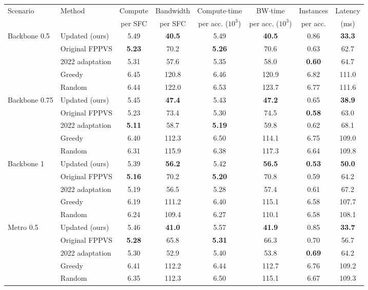 \begin{tabular}{llcccccc}
\toprule
Scenario & Method & Compute & Bandwidth & Compute$\cdot$time & BW$\cdot$time & Instances & Latency \\
 & & per SFC & per SFC & per acc. ($10^3$) & per acc. ($10^3$) & per acc. & (ms) \\
\midrule
Backbone 0.5 & Updated (ours) & 5.49 & \textbf{40.5} & 5.49 & \textbf{40.5} & 0.86 & \textbf{33.3} \\
 & Original FPPVS & \textbf{5.23} & 70.2 & \textbf{5.26} & 70.6 & 0.63 & 62.7 \\
 & 2022 adaptation & 5.31 & 57.6 & 5.35 & 58.0 & \textbf{0.60} & 64.7 \\
 & Greedy & 6.45 & 120.8 & 6.46 & 120.9 & 6.82 & 111.0 \\
 & Random & 6.44 & 122.0 & 6.53 & 123.7 & 6.77 & 111.6 \\
\midrule
Backbone 0.75 & Updated (ours) & 5.45 & \textbf{47.4} & 5.43 & \textbf{47.2} & 0.65 & \textbf{38.9} \\
 & Original FPPVS & 5.23 & 73.4 & 5.30 & 74.5 & \textbf{0.58} & 63.0 \\
 & 2022 adaptation & \textbf{5.11} & 58.7 & \textbf{5.19} & 59.8 & 0.62 & 68.1 \\
 & Greedy & 6.40 & 112.3 & 6.50 & 114.1 & 6.75 & 109.0 \\
 & Random & 6.31 & 115.9 & 6.38 & 117.3 & 6.64 & 109.8 \\
\midrule
Backbone 1 & Updated (ours) & 5.39 & \textbf{56.2} & 5.42 & \textbf{56.5} & \textbf{0.53} & \textbf{50.0} \\
 & Original FPPVS & \textbf{5.16} & 70.2 & \textbf{5.20} & 70.8 & 0.59 & 64.2 \\
 & 2022 adaptation & 5.19 & 56.5 & 5.28 & 57.4 & 0.61 & 67.2 \\
 & Greedy & 6.19 & 111.2 & 6.40 & 115.1 & 6.58 & 107.7 \\
 & Random & 6.24 & 109.4 & 6.27 & 110.1 & 6.58 & 108.1 \\
\midrule
Metro 0.5 & Updated (ours) & 5.46 & \textbf{41.0} & 5.57 & \textbf{41.9} & 0.85 & \textbf{33.7} \\
 & Original FPPVS & \textbf{5.28} & 65.8 & \textbf{5.31} & 66.3 & 0.70 & 56.7 \\
 & 2022 adaptation & 5.30 & 52.9 & 5.40 & 53.8 & \textbf{0.69} & 64.2 \\
 & Greedy & 6.41 & 112.2 & 6.44 & 112.7 & 6.76 & 109.2 \\
 & Random & 6.35 & 112.3 & 6.50 & 115.1 & 6.67 & 109.3 \\

\end{tabular}
